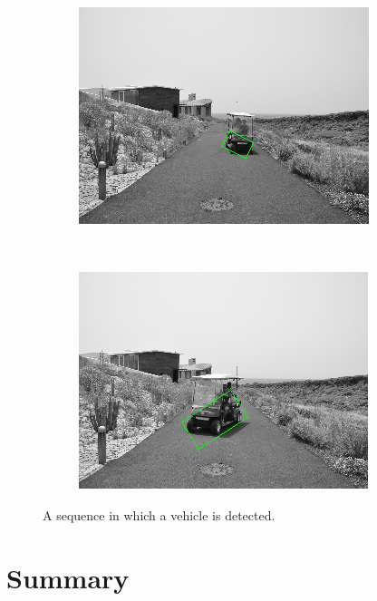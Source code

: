\begin{figure}[h!]
\begin{subfigure}[b]{0.24\columnwidth}
	    \includegraphics[width=\textwidth]{sequence/seq7}\label{fig:seq7}
        \end{subfigure}%
        ~
        \begin{subfigure}[b]{0.24\columnwidth}
	    \includegraphics[width=\textwidth]{sequence/seq8}\label{fig:seq8}
        \end{subfigure}%
        \caption{A sequence in which a vehicle is detected.}\label{fig:cp02_pipeline_example}
\end{figure}

\section{Summary}\label{ch:chapter02_03}

